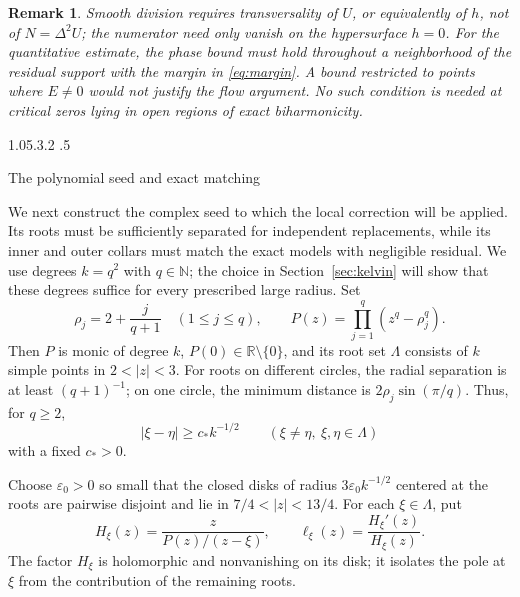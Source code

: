 \documentclass[11pt,a4paper,leqno]{amsart}
\makeatletter
\numberwithin{equation}{section}
\theoremstyle{landisplain}
\theoremstyle{landisdefinition}
\theoremstyle{landisremark}
\newtheorem{remark}[theorem]{Remark}
\newcommand{\R}{\mathbb R}
\newcommand{\N}{\mathbb N}
\newcommand{\eps}{\varepsilon}
\renewcommand\section{\Needspace{7\baselineskip}\@startsection{section}{1}{\z@}%
  {1.05\baselineskip \@plus .3\baselineskip \@minus .2\baselineskip}%
  {.5\baselineskip}%
  {\normalfont\large\bfseries\raggedright}}
\makeatother
\begin{document}
\begin{remark}\label{rem:repair-scope}
Smooth division requires transversality of $U$, or equivalently
of $h$, not of $N=\Delta^2U$; the numerator need only vanish
on the hypersurface $h=0$. For the quantitative estimate, the phase
bound must hold throughout a neighborhood of the residual support
with the margin in \eqref{eq:margin}. A bound restricted to points
where $E\ne0$ would not justify the flow argument. No such
condition is needed at critical zeros lying in open regions of
exact biharmonicity.
\end{remark}

\section{The polynomial seed and exact matching}
\label{sec:seed}

We next construct the complex seed to which the local correction
will be applied. Its roots must be sufficiently separated for
independent replacements, while its inner and outer collars must
match the exact models with negligible residual. We use degrees
$k=q^2$ with $q\in\N$; the choice in
Section~\ref{sec:kelvin} will show that these degrees suffice
for every prescribed large radius. Set
\begin{equation}\label{eq:P}
 \rho_j=2+\frac{j}{q+1}\quad(1\le j\le q),\qquad
 P(z)=\prod_{j=1}^q(z^q-\rho_j^q).
\end{equation}
Then $P$ is monic of degree $k$, $P(0)\in\R\setminus\{0\}$, and
its root set $\Lambda$ consists of $k$ simple points in $2<|z|<3$.
For roots on different circles, the radial separation is at least
$(q+1)^{-1}$; on one circle, the minimum distance is
$2\rho_j\sin(\pi/q)$. Thus, for $q\ge2$,
\begin{equation}\label{eq:root-separation}
 |\xi-\eta|\ge c_*k^{-1/2}\qquad(\xi\ne\eta,\ \xi,\eta\in\Lambda)
\end{equation}
with a fixed $c_*>0$.

Choose $\eps_0>0$ so small that the closed disks of radius
$3\eps_0k^{-1/2}$ centered at the roots are pairwise disjoint and lie
in $7/4<|z|<13/4$. For each $\xi\in\Lambda$, put
\begin{equation}\label{eq:H}
 H_\xi(z)=\frac{z}{P(z)/(z-\xi)},\qquad
 \ell_\xi(z)=\frac{H_\xi'(z)}{H_\xi(z)}.
\end{equation}
The factor $H_\xi$ is holomorphic and nonvanishing on its disk;
it isolates the pole at $\xi$ from the contribution of the
remaining roots.
\end{document}
